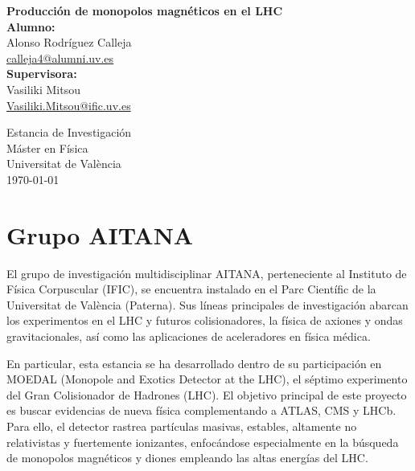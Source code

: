 \documentclass[12pt, a4paper]{article}
\begin{document}
\begin{titlepage}
    \centering
    \vspace*{2cm}
    
    {\Huge \textbf{Producción de monopolos magnéticos en el LHC}}\\[2cm]
    
    {\Large \textbf{Alumno:}}\\
    Alonso Rodríguez Calleja\\
    \href{mailto:calleja4@alumni.uv.es}{calleja4@alumni.uv.es}\\[1.5cm]
    
    {\Large \textbf{Supervisora: }}\\
    Vasiliki Mitsou\\
    \href{mailto:Vasiliki.Mitsou@ific.uv.es}{Vasiliki.Mitsou@ific.uv.es}\\[2cm]
    
    \vfill
    
    {\Large  Estancia de Investigación}\\
    {\normalsize Máster en Física}\\
    {\normalsize Universitat de València}\\[1cm]
    
    {\normalsize \today}
\end{titlepage}

\setcounter{page}{2}

\section{Grupo AITANA}

El grupo de investigación multidisciplinar AITANA, perteneciente al Instituto de Física Corpuscular (IFIC), se encuentra instalado en el Parc Científic de la Universitat de València (Paterna). Sus líneas principales de investigación abarcan los experimentos en el LHC y futuros colisionadores, la física de axiones y ondas gravitacionales, así como las aplicaciones de aceleradores en física médica.

En particular, esta estancia se ha desarrollado dentro de su participación en MOEDAL (Monopole and Exotics Detector at the LHC), el séptimo experimento del Gran Colisionador de Hadrones (LHC). El objetivo principal de este proyecto es buscar evidencias de nueva física complementando a ATLAS, CMS y LHCb. Para ello, el detector rastrea partículas masivas, estables, altamente no relativistas y fuertemente ionizantes, enfocándose especialmente en la búsqueda de monopolos magnéticos y diones \cite{doi:10.1126/science.165.3895.757} empleando las altas energías del LHC.
\end{document}
